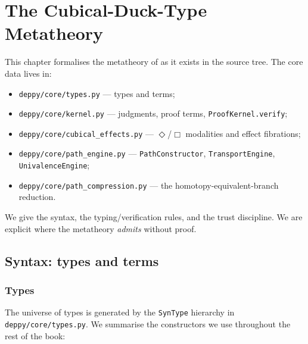 \chapter{The Cubical-Duck-Type Metatheory}
\label{ch:cubical}

This chapter formalises the metatheory of \Deppy{} as it exists in
the source tree.  The core data lives in:
\begin{itemize}[leftmargin=1.7em]
  \item \texttt{deppy/core/types.py} --- types and terms;
  \item \texttt{deppy/core/kernel.py} --- judgments, proof terms,
    \texttt{ProofKernel.verify};
  \item \texttt{deppy/core/cubical\_effects.py} ---
    $\Diamond$/$\Box$ modalities and effect fibrations;
  \item \texttt{deppy/core/path\_engine.py} ---
    \texttt{PathConstructor}, \texttt{TransportEngine},
    \texttt{UnivalenceEngine};
  \item \texttt{deppy/core/path\_compression.py} --- the
    homotopy-equivalent-branch reduction.
\end{itemize}

We give the syntax, the typing/verification rules, and the trust
discipline.  We are explicit where the metatheory \emph{admits}
without proof.

\section{Syntax: types and terms}
\label{sec:cubical-syntax}

\subsection{Types}

The universe of \Deppy{} types is generated by the \texttt{SynType}
hierarchy in \texttt{deppy/core/types.py}.  We summarise the
constructors we use throughout the rest of the book:

